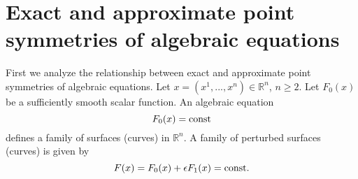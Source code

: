 \documentclass[11pt,letter,subeqn]{article}
\def\const{\hbox{\rm const}}
\begin{document}
\section{Exact and approximate point symmetries of algebraic equations} \label{sec:Alg}

First we analyze the relationship between exact and approximate point symmetries of algebraic equations. Let $x=(x^1,...,x^n) \in \mathbb{R}^n$, $n\geq 2$.  Let $F_0(x)$ be a sufficiently smooth scalar function. An algebraic equation
\begin{equation}\label{eq2}
  F_0(x)=\const
\end{equation}
defines a family of surfaces (curves) in $\mathbb{R}^n$. A family of perturbed surfaces (curves) is given by
\begin{equation}\label{m11}
  F(x)=F_0(x)+\epsilon F_1(x)=\const.
\end{equation}
\end{document}
